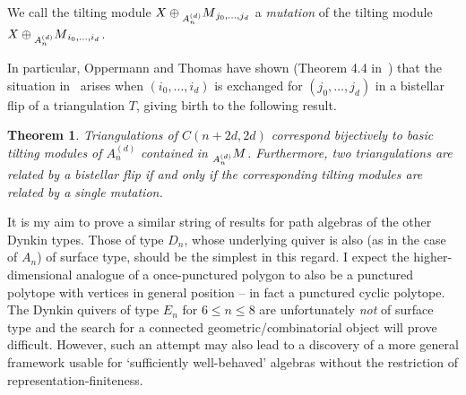\documentclass[a4paper,oneside,svgnames]{amsart}
\theoremstyle{plain}
\newtheorem{theorem}{Theorem}[section]
\theoremstyle{definition}
\begin{document}
 We call the tilting module $X \oplus \prescript{}{A^{(d)}_n}M_{j_0,\ldots,j_d}$
 a \emph{mutation} of the tilting module $X \oplus
 \prescript{}{A^{(d)}_n}M_{i_0,\ldots,i_d}$.

 In particular, Oppermann and Thomas have shown (Theorem 4.4 in~\cite{ot}) that
 the situation in~ arises when $(i_0,\ldots,i_d)$ is
 exchanged for $(j_0,\ldots,j_d)$ in a bistellar flip of a triangulation $T$,
 giving birth to the following result.

 \begin{theorem}
  Triangulations of $C(n+2d,2d)$ correspond bijectively to basic tilting modules
  of $A^{(d)}_n$ contained in $\prescript{}{A^{(d)}_n}M$. Furthermore, two
  triangulations are related by a bistellar flip if and only if the
  corresponding tilting modules are related by a single mutation.
 \end{theorem}

 It is my aim to prove a similar string of results for path algebras of the
 other Dynkin types. Those of type $D_n$, whose underlying quiver is also (as in
 the case of $A_n$) of surface type, should be the simplest in this regard. I
 expect the higher-dimensional analogue of a once-punctured polygon to also be a
 punctured polytope with vertices in general position -- in fact a punctured
 cyclic polytope. The Dynkin quivers of type $E_n$ for $6 \leq n \leq 8$ are
 unfortunately \emph{not} of surface type and the search for a connected
 geometric/combinatorial object will prove difficult. However, such an attempt
 may also lead to a discovery of a more general framework usable for
 `sufficiently well-behaved' algebras without the restriction of
 representation-finiteness.
 
\end{document}
